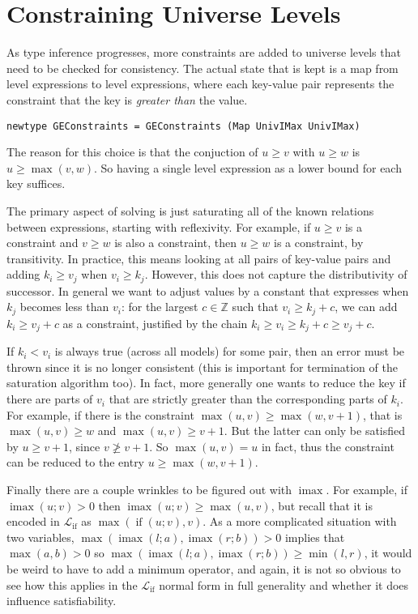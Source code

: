 \documentclass[11pt, twoside, reqno]{book}
\DeclareMathOperator{\imax}{imax}
\DeclareMathOperator{\ifop}{if}
\begin{document}
\section{Constraining Universe Levels}

As type inference progresses, more constraints are added to universe levels that need to be checked for consistency.
The actual state that is kept is a map from level expressions to level expressions, where each key-value pair represents the constraint that the key is \emph{greater than} the value.

\begin{verbatim}
newtype GEConstraints = GEConstraints (Map UnivIMax UnivIMax)
\end{verbatim}

The reason for this choice is that the conjuction of \(u \ge v\) with \(u \ge w\) is \(u \ge \max(v, w)\).
So having a single level expression as a lower bound for each key suffices.

The primary aspect of solving is just saturating all of the known relations between expressions, starting with reflexivity.
For example, if \(u \ge v\) is a constraint and \(v \ge w\) is also a constraint, then \(u \ge w\) is a constraint, by transitivity.
In practice, this means looking at all pairs of key-value pairs and adding \(k_i \ge v_j\) when \(v_i \ge k_j\).
However, this does not capture the distributivity of successor.
In general we want to adjust values by a constant that expresses when \(k_j\) becomes less than \(v_i\): for the largest \(c \in \mathbb{Z}\) such that \(v_i \ge k_j + c\), we can add \(k_i \ge v_j + c\) as a constraint, justified by the chain \(k_i \ge v_i \ge k_j + c \ge v_j + c\).

If \(k_i < v_i\) is always true (across all models) for some pair, then an error must be thrown since it is no longer consistent (this is important for termination of the saturation algorithm too).
In fact, more generally one wants to reduce the key if there are parts of \(v_i\) that are strictly greater than the corresponding parts of \(k_i\).
For example, if there is the constraint \(\max(u, v) \ge \max(w, v+1)\), that is \(\max(u, v) \ge w\) and \(\max(u, v) \ge v+1\).
But the latter can only be satisfied by \(u \ge v+1\), since \(v \ngeq v+1\).
So \(\max(u, v) = u\) in fact, thus the constraint can be reduced to the entry \(u \ge \max(w, v+1)\).

Finally there are a couple wrinkles to be figured out with \(\imax\).
For example, if \(\imax(u; v) > 0\) then \(\imax(u; v) \ge \max(u, v)\), but recall that it is encoded in \(\mathcal{L}_{\ifop}\) as \(\max(\ifop(u; v), v)\).
As a more complicated situation with two variables, \(\max(\imax(l; a), \imax(r; b)) > 0\) implies that \(\max(a, b) > 0\) so \(\max(\imax(l; a), \imax(r; b)) \ge \min(l, r)\), it would be weird to have to add a minimum operator, and again, it is not so obvious to see how this applies in the \(\mathcal{L}_{\ifop}\) normal form in full generality and whether it does influence satisfiability.
\end{document}

